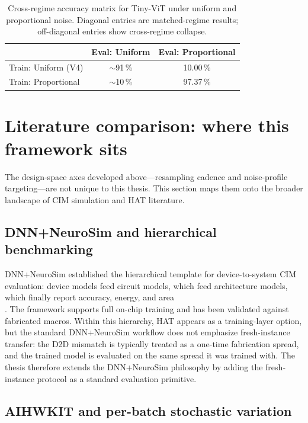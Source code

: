 \begin{table}[t]
    \centering
    \caption{Cross-regime accuracy matrix for Tiny-ViT under uniform and proportional noise. Diagonal entries are matched-regime results; off-diagonal entries show cross-regime collapse.}
    \label{tab:noise-regime-matrix}
    \small
    \begin{tabular}{lcc}
        \toprule
        & \textbf{Eval: Uniform} & \textbf{Eval: Proportional} \\
        \midrule
        Train: Uniform (V4) & $\sim$91\,\% & 10.00\,\% \\
        Train: Proportional & $\sim$10\,\% & 97.37\,\% \\
        \bottomrule
    \end{tabular}
\end{table}

\section{Literature comparison: where this framework sits}
\label{sec:literature-comparison}

The design-space axes developed above---resampling cadence and noise-profile targeting---are not unique to this thesis. This section maps them onto the broader landscape of CIM simulation and HAT literature.

\subsection{DNN+NeuroSim and hierarchical benchmarking}

DNN+NeuroSim established the hierarchical template for device-to-system CIM evaluation: device models feed circuit models, which feed architecture models, which finally report accuracy, energy, and area \\\citep{peng2020dnnneurosim}. The framework supports full on-chip training and has been validated against fabricated macros. Within this hierarchy, HAT appears as a training-layer option, but the standard DNN+NeuroSim workflow does not emphasize fresh-instance transfer: the D2D mismatch is typically treated as a one-time fabrication spread, and the trained model is evaluated on the same spread it was trained with. The thesis therefore extends the DNN+NeuroSim philosophy by adding the fresh-instance protocol as a standard evaluation primitive.

\subsection{AIHWKIT and per-batch stochastic variation}

